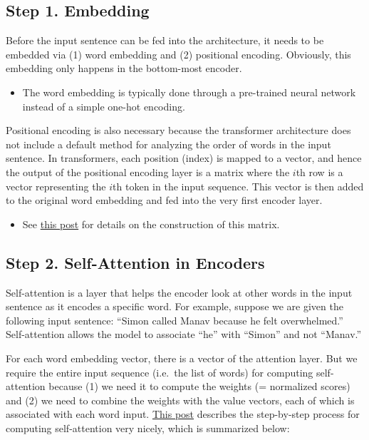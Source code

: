 \documentclass[
]{book}
\providecommand{\tightlist}{%
  \setlength{\itemsep}{0pt}\setlength{\parskip}{0pt}}
\begin{document}
\hypertarget{step-1.-embedding}{%
\subsection{Step 1. Embedding}\label{step-1.-embedding}}

Before the input sentence can be fed into the architecture, it needs to be embedded via (1) word embedding and (2) positional encoding. Obviously, this embedding only happens in the bottom-most encoder.

\begin{itemize}
\tightlist
\item
  The word embedding is typically done through a pre-trained neural network instead of a simple one-hot encoding.
\end{itemize}

Positional encoding is also necessary because the transformer architecture does not include a default method for analyzing the order of words in the input sentence. In transformers, each position (index) is mapped to a vector, and hence the output of the positional encoding layer is a matrix where the \(i\)th row is a vector representing the \(i\)th token in the input sequence. This vector is then added to the original word embedding and fed into the very first encoder layer.

\begin{itemize}
\tightlist
\item
  See \href{https://jalammar.github.io/illustrated-transformer/}{this post} for details on the construction of this matrix.
\end{itemize}

\hypertarget{step-2.-self-attention-in-encoders}{%
\subsection{Step 2. Self-Attention in Encoders}\label{step-2.-self-attention-in-encoders}}

Self-attention is a layer that helps the encoder look at other words in the input sentence as it encodes a specific word. For example, suppose we are given the following input sentence: ``Simon called Manav because he felt overwhelmed.'' Self-attention allows the model to associate ``he'' with ``Simon'' and not ``Manav.''

For each word embedding vector, there is a vector of the attention layer. But we require the entire input sequence (i.e.~the list of words) for computing self-attention because (1) we need it to compute the weights (= normalized scores) and (2) we need to combine the weights with the value vectors, each of which is associated with each word input. \href{https://jalammar.github.io/illustrated-transformer/}{This post} describes the step-by-step process for computing self-attention very nicely, which is summarized below:
\end{document}
